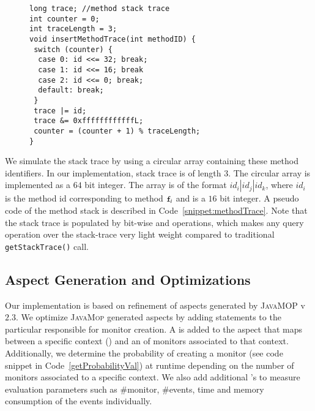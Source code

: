 \begin{figure}[t]
\begin{lstlisting}
long trace; //method stack trace
int counter = 0;
int traceLength = 3;
void insertMethodTrace(int methodID) {
 switch (counter) {
  case 0: id <<= 32; break;
  case 1: id <<= 16; break
  case 2: id <<= 0; break;
  default: break;
 }
 trace |= id;
 trace &= 0xffffffffffffL;
 counter = (counter + 1) % traceLength;
}
\end{lstlisting}
\end{figure}

We simulate the stack trace by using a circular array containing these method 
identifiers. In our implementation, stack trace is of length $3$. The circular
array is implemented as a $64$ bit  integer. The array is of the
format $id_i|id_j|id_k$, where $id_i$ is the method id corresponding to method
$\code{f}_i$ and is a $16$ bit integer. A pseudo code of the method stack is
described in Code~\ref{snippet:methodTrace}.
Note that the stack trace is populated by bit-wise \code{<<} and \code{|} 
operations, which makes any query operation over the stack-trace very light 
weight compared to traditional \texttt{getStackTrace()} call.

\subsection{Aspect Generation and Optimizations}
\label{subsec:aspectGen}

Our implementation is based on refinement of aspects generated by 
\textsc{JavaMOP} v$2.3$. 
% 
% 
We optimize \textsc{JavaMop} generated aspects by adding statements to the 
particular  responsible for monitor creation. A  
 is added to the aspect that maps between a specific context () and 
an  of monitors associated to that context. Additionally, we 
 determine the probability of creating a monitor (see code snippet in
 Code~\ref{getProbabilityVal}) at runtime depending on the number of  monitors
 associated to a specific context. %
 We also add additional 's to measure evaluation parameters such 
 as \#monitor, \#events, time and memory consumption of the events individually.

